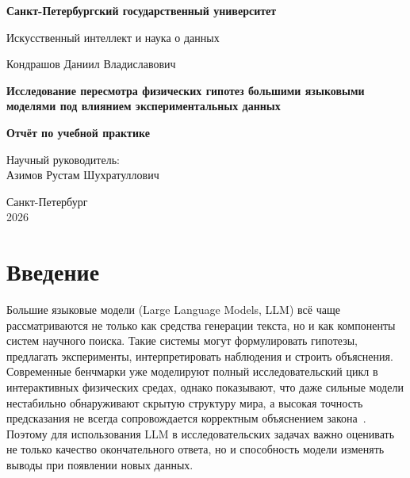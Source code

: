 \documentclass[a4paper,14pt]{extarticle}
\begin{document}
\begin{titlepage}
  \begin{center}
    \vspace*{1cm}

    {\large \textbf{Санкт-Петербургский государственный университет}}

    \vspace{0.5cm}

    {\large Искусственный интеллект и наука о данных}

    \vspace{4.5cm}

    {\large Кондрашов Даниил Владиславович}

    \vspace{1cm}

    {\Large \textbf{Исследование пересмотра физических гипотез большими языковыми моделями под влиянием экспериментальных данных}}

    \vspace{1cm}

    {\Large \textbf{Отчёт по учебной практике}}

    \vspace{1.8cm}

    \begin{flushright}
      {Научный руководитель:} \\
      {Азимов Рустам Шухратуллович}
    \end{flushright}

    \vfill

    {\large Санкт-Петербург \\ 2026}
  \end{center}
\end{titlepage}

\tableofcontents
\newpage
{}

\section{Введение}

Большие языковые модели (Large Language Models, LLM) всё чаще рассматриваются не только как средства генерации текста, но и как компоненты систем научного поиска. Такие системы могут формулировать гипотезы, предлагать эксперименты, интерпретировать наблюдения и строить объяснения. Современные бенчмарки уже моделируют полный исследовательский цикл в интерактивных физических средах, однако показывают, что даже сильные модели нестабильно обнаруживают скрытую структуру мира, а высокая точность предсказания не всегда сопровождается корректным объяснением закона~\cite{discoverphysics,physgym}. Поэтому для использования LLM в исследовательских задачах важно оценивать не только качество окончательного ответа, но и способность модели изменять выводы при появлении новых данных.
\end{document}
